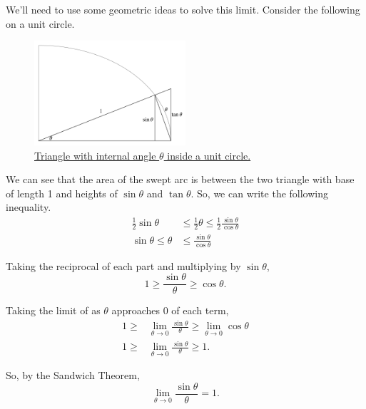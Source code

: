 \begin{answer}
	We'll need to use some geometric ideas to solve this limit.
	Consider the following on a unit circle.
	
	\begin{figure}[H]
		\label{sin_limit_proof}
		\centering
		\includegraphics[width = 0.5\textwidth]{./limits_continuity/sin_limit_proof.png}
		\caption{\hyperref{}{}{}{Triangle with internal angle $\theta$ inside a unit circle.}}
	\end{figure}
	
	We can see that the area of the swept arc is between the two triangle with base of length 1 and heights of $\sin{\theta}$ and $\tan{\theta}$.
	So, we can write the following inequality.
	\begin{align*}
		\frac{1}{2}\sin{\theta} &\leq \frac{1}{2}\theta \leq \frac{1}{2}\frac{\sin{\theta}}{\cos{\theta}} \\
		\sin{\theta} \leq \theta &\leq \frac{\sin{\theta}}{\cos{\theta}}
	\end{align*}
	
	Taking the reciprocal of each part and multiplying by $\sin{\theta}$,
	\begin{equation*}
		1 \geq \frac{\sin{\theta}}{\theta} \geq \cos{\theta}.
	\end{equation*}
	
	Taking the limit of as $\theta$ approaches 0 of each term,
	\begin{align*}
		1 \geq & \lim_{\theta \to 0}{\frac{\sin{\theta}}{\theta}} \geq \lim_{\theta\to 0}{\cos{\theta}} \\
		1 \geq & \lim_{\theta \to 0}{\frac{\sin{\theta}}{\theta}} \geq 1.
	\end{align*}
	
	So, by the Sandwich Theorem,
	\begin{equation*}
		\lim_{\theta \to 0}{\frac{\sin{\theta}}{\theta}} = 1.
	\end{equation*}
\end{answer}